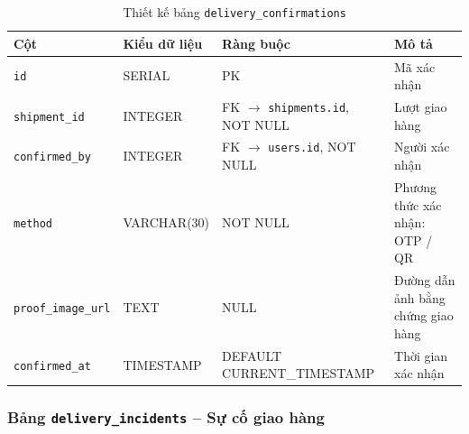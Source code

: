 \begin{table}[H]
\centering
\caption{Thiết kế bảng \texttt{delivery\_confirmations}}
\begin{tabularx}{\textwidth}{|l|l|Z|Z|}
\hline
\textbf{Cột} &
\textbf{Kiểu dữ liệu} &
\textbf{Ràng buộc} &
\textbf{Mô tả} \\ \hline

\texttt{id}
& SERIAL
& PK
& Mã xác nhận \\ \hline

\texttt{shipment\_id}
& INTEGER
& FK $\rightarrow$ \texttt{shipments.id}, NOT NULL
& Lượt giao hàng \\ \hline

\texttt{confirmed\_by}
& INTEGER
& FK $\rightarrow$ \texttt{users.id}, NOT NULL
& Người xác nhận \\ \hline

\texttt{method}
& VARCHAR(30)
& NOT NULL
& Phương thức xác nhận: OTP / QR \\ \hline

\texttt{proof\_image\_url}
& TEXT
& NULL
& Đường dẫn ảnh bằng chứng giao hàng \\ \hline

\texttt{confirmed\_at}
& TIMESTAMP
& DEFAULT CURRENT\_TIMESTAMP
& Thời gian xác nhận \\ \hline

\end{tabularx}
\end{table}



\subsubsection{Bảng \texttt{delivery\_incidents} -- Sự cố giao hàng}

